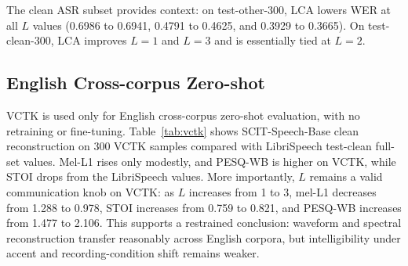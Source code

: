 \documentclass[10pt,twocolumn]{article}
\newcommand{\base}{SCIT-Speech-Base}
\begin{document}
The clean ASR subset provides context: on test-other-300, LCA lowers WER at all \(L\) values (0.6986 to 0.6941, 0.4791 to 0.4625, and 0.3929 to 0.3665). On test-clean-300, LCA improves \(L=1\) and \(L=3\) and is essentially tied at \(L=2\).

\begin{table}[t]
\centering
\caption{Clean ASR results with Whisper base.en.}
\label{tab:wer_clean}
\small
{}
\end{table}

\subsection{English Cross-corpus Zero-shot}

VCTK is used only for English cross-corpus zero-shot evaluation, with no retraining or fine-tuning. Table~\ref{tab:vctk} shows \base{} clean reconstruction on 300 VCTK samples compared with LibriSpeech test-clean full-set values. Mel-L1 rises only modestly, and PESQ-WB is higher on VCTK, while STOI drops from the LibriSpeech values. More importantly, \(L\) remains a valid communication knob on VCTK: as \(L\) increases from 1 to 3, mel-L1 decreases from 1.288 to 0.978, STOI increases from 0.759 to 0.821, and PESQ-WB increases from 1.477 to 2.106. This supports a restrained conclusion: waveform and spectral reconstruction transfer reasonably across English corpora, but intelligibility under accent and recording-condition shift remains weaker.

\begin{table}[t]
\centering
\caption{English cross-corpus zero-shot clean reconstruction for \base{}.}
\label{tab:vctk}
\small
{}
\end{table}
\end{document}
